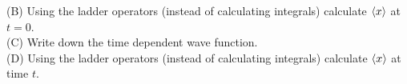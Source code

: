 \documentclass[12pt]{article}
\begin{document}
\noindent
(B) Using the ladder operators (instead of calculating integrals) calculate $\braket{x}$
at $t=0$.\\[5pt]

\noindent
(C) Write down the time dependent wave function.\\[5pt]

\noindent
(D) Using the ladder operators (instead of calculating integrals) calculate $\braket{x}$
at time $t$.\\[5pt]
\end{document}
